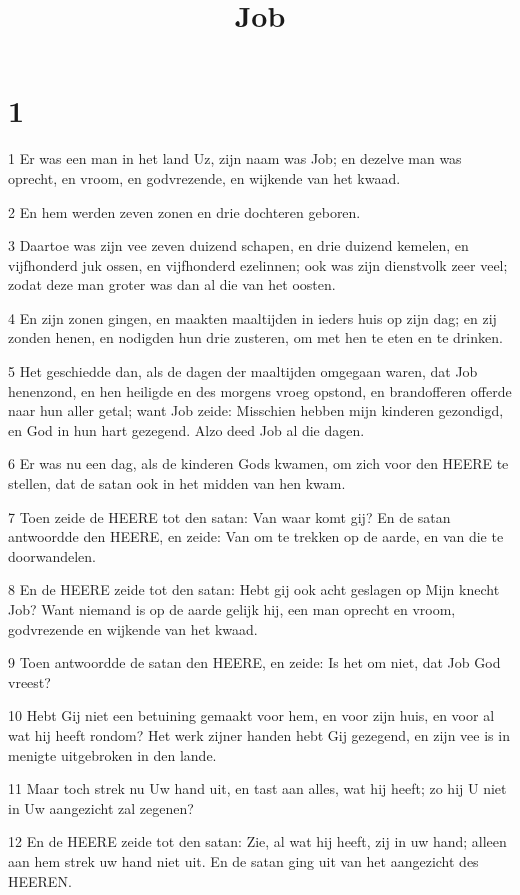 

\title{Job}



\chapter{1}

\par 1 Er was een man in het land Uz, zijn naam was Job; en dezelve man was oprecht, en vroom, en godvrezende, en wijkende van het kwaad.
\par 2 En hem werden zeven zonen en drie dochteren geboren.
\par 3 Daartoe was zijn vee zeven duizend schapen, en drie duizend kemelen, en vijfhonderd juk ossen, en vijfhonderd ezelinnen; ook was zijn dienstvolk zeer veel; zodat deze man groter was dan al die van het oosten.
\par 4 En zijn zonen gingen, en maakten maaltijden in ieders huis op zijn dag; en zij zonden henen, en nodigden hun drie zusteren, om met hen te eten en te drinken.
\par 5 Het geschiedde dan, als de dagen der maaltijden omgegaan waren, dat Job henenzond, en hen heiligde en des morgens vroeg opstond, en brandofferen offerde naar hun aller getal; want Job zeide: Misschien hebben mijn kinderen gezondigd, en God in hun hart gezegend. Alzo deed Job al die dagen.
\par 6 Er was nu een dag, als de kinderen Gods kwamen, om zich voor den HEERE te stellen, dat de satan ook in het midden van hen kwam.
\par 7 Toen zeide de HEERE tot den satan: Van waar komt gij? En de satan antwoordde den HEERE, en zeide: Van om te trekken op de aarde, en van die te doorwandelen.
\par 8 En de HEERE zeide tot den satan: Hebt gij ook acht geslagen op Mijn knecht Job? Want niemand is op de aarde gelijk hij, een man oprecht en vroom, godvrezende en wijkende van het kwaad.
\par 9 Toen antwoordde de satan den HEERE, en zeide: Is het om niet, dat Job God vreest?
\par 10 Hebt Gij niet een betuining gemaakt voor hem, en voor zijn huis, en voor al wat hij heeft rondom? Het werk zijner handen hebt Gij gezegend, en zijn vee is in menigte uitgebroken in den lande.
\par 11 Maar toch strek nu Uw hand uit, en tast aan alles, wat hij heeft; zo hij U niet in Uw aangezicht zal zegenen?
\par 12 En de HEERE zeide tot den satan: Zie, al wat hij heeft, zij in uw hand; alleen aan hem strek uw hand niet uit. En de satan ging uit van het aangezicht des HEEREN.
